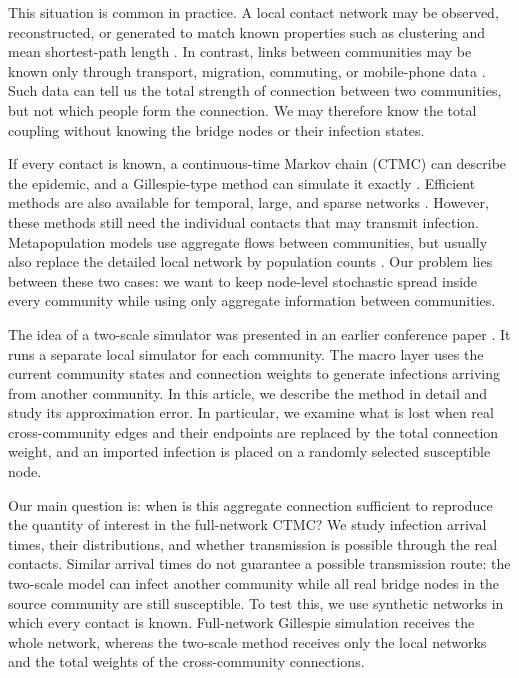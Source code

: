 \documentclass[a4paper,fleqn]{cas-sc}
\begin{document}
This situation is common in practice. A local contact network may be observed, reconstructed, or generated to match known properties such as clustering and mean shortest-path length \citep{eubank2004,danon2011}. In contrast, links between communities may be known only through transport, migration, commuting, or mobile-phone data \citep{barbosa2018human,chang2021}. Such data can tell us the total strength of connection between two communities, but not which people form the connection. We may therefore know the total coupling without knowing the bridge nodes or their infection states.

If every contact is known, a continuous-time Markov chain (CTMC) can describe the epidemic, and a Gillespie-type method can simulate it exactly \citep{gillespie1977exact,gibson2000}. Efficient methods are also available for temporal, large, and sparse networks \citep{vestergaard2015,kuryliak2025simulating}. However, these methods still need the individual contacts that may transmit infection. Metapopulation models use aggregate flows between communities, but usually also replace the detailed local network by population counts \citep{colizza2007reaction,colizza2008,balcan2010modeling,ajelli2010}. Our problem lies between these two cases: we want to keep node-level stochastic spread inside every community while using only aggregate information between communities.

The idea of a two-scale simulator was presented in an earlier conference paper \citep{kuryliak2025towards}. It runs a separate local simulator for each community. The macro layer uses the current community states and connection weights to generate infections arriving from another community. In this article, we describe the method in detail and study its approximation error. In particular, we examine what is lost when real cross-community edges and their endpoints are replaced by the total connection weight, and an imported infection is placed on a randomly selected susceptible node.

Our main question is: when is this aggregate connection sufficient to reproduce the quantity of interest in the full-network CTMC? We study infection arrival times, their distributions, and whether transmission is possible through the real contacts. Similar arrival times do not guarantee a possible transmission route: the two-scale model can infect another community while all real bridge nodes in the source community are still susceptible. To test this, we use synthetic networks in which every contact is known. Full-network Gillespie simulation receives the whole network, whereas the two-scale method receives only the local networks and the total weights of the cross-community connections.
\end{document}
